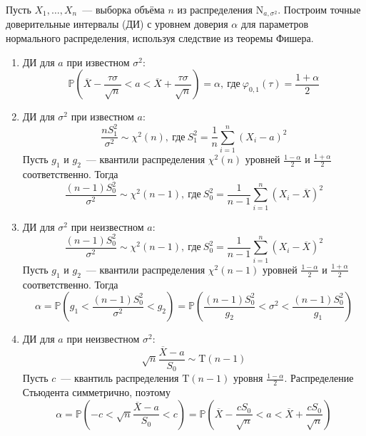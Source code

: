 \documentclass[oneside,final,14pt]{extreport}
\theoremstyle{plain}
\theoremstyle{definition}
\theoremstyle{named}
\begin{document}
Пусть $X_{1}, \ldots, X_{n}$~--- выборка объёма $n$ из распределения $\mathrm{N}_{a, \sigma^{2}}$. Построим точные доверительные интервалы (ДИ) с уровнем доверия $\alpha$ для параметров нормального распределения, используя следствие из теоремы Фишера.
\begin{enumerate}
    \item ДИ для $a$ при известном $\sigma^{2}$:
    \begin{equation*}
        \mathbb{P}\left(\overline{X}-\frac{\tau \sigma}{\sqrt{n}}<a<\overline{X}+\frac{\tau \sigma}{\sqrt{n}}\right)=\alpha, ~ \text {где} ~ \varphi_{0,1}(\tau)=\frac{1 + \alpha}{2}
    \end{equation*}
    \item ДИ для $\sigma^{2}$ при известном $a$:
    \begin{equation*}
        \frac{n S_{1}^{2}}{\sigma^{2}} \sim \chi^{2}(n),~ \text {где}~ S_{1}^{2}=\frac{1}{n} \sum\limits_{i=1}^{n}\left(X_{i}-a\right)^{2}
    \end{equation*}
    Пусть $g_1$ и $g_2$~--- квантили распределения $\chi^{2}(n)$ уровней $\frac{1-\alpha}{2}$ и $\frac{1+\alpha}{2}$ соответственно. Тогда
    \begin{equation*}
        \frac{(n-1) S_{0}^{2}}{\sigma^{2}} \sim \chi^{2}(n-1),~ \text {где}~ S_{0}^{2}=\frac{1}{n-1} \sum\limits_{i=1}^{n}\left(X_{i}-\overline{X}\right)^{2}
    \end{equation*}
    \item ДИ для $\sigma^{2}$ при неизвестном $a$:
    \begin{equation*}
        \frac{(n-1) S_{0}^{2}}{\sigma^{2}} \sim \chi^{2}(n-1),~ \text {где}~ S_{0}^{2}=\frac{1}{n-1} \sum\limits_{i=1}^{n}\left(X_{i}-\overline{X}\right)^{2}
    \end{equation*}
    Пусть $g_1$ и $g_2$~--- квантили распределения $\chi^{2}(n-1)$ уровней $\frac{1-\alpha}{2}$ и $\frac{1+\alpha}{2}$ соответственно. Тогда
    \begin{equation*}
        \alpha=\mathbb{P}\left(g_{1}<\frac{(n-1) S_{0}^{2}}{\sigma^{2}}<g_{2}\right)=\mathbb{P}\left(\frac{(n-1) S_{0}^{2}}{g_{2}}<\sigma^{2}<\frac{(n-1) S_{0}^{2}}{g_{1}}\right)
    \end{equation*}
    \item ДИ для $a$ при неизвестном $\sigma^{2}$:
    \begin{equation*}
        \sqrt{n} \frac{\overline{X}-a}{S_{0}} \sim \mathrm{T}(n-1)
    \end{equation*}
    Пусть $c$~--- квантиль распределения $\mathrm{T}(n-1)$ уровня $\frac{1-\alpha}{2}$. Распределение Стьюдента симметрично, поэтому
    \begin{equation*}
        \alpha=\mathbb{P}\left(-c<\sqrt{n} \frac{\overline{X}-a}{S_{0}}<c\right)=\mathbb{P}\left(\overline{X}-\frac{c S_{0}}{\sqrt{n}}<a<\overline{X}+\frac{c S_{0}}{\sqrt{n}}\right)
    \end{equation*}
\end{enumerate}
\end{document}
